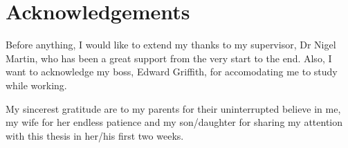 \chapter*{Acknowledgements}

Before anything, I would like to extend my thanks to my supervisor, Dr Nigel Martin, who has been a great support from the very start to the end. Also, I want to acknowledge my boss, Edward Griffith, for accomodating me to study while working.

My sincerest gratitude are to my parents for their uninterrupted believe in me, my wife for her endless patience and my son/daughter for sharing my attention with this thesis in her/his first two weeks.